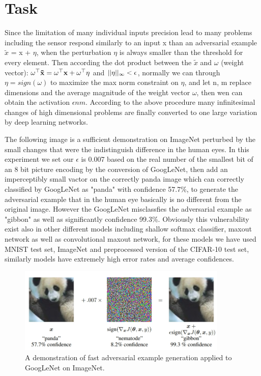 \chapter{Task}

Since the limitation of many individual inputs precision lead to many problems including the sensor respond similarly to an input x than an adversarial example $\tilde{x}$ = x + $\eta$, when the perturbation $\eta$ is always smaller than the threshold for every element. Then according the dot product between the $\tilde{x}$ and $\omega$ (weight vector): $\bf \omega ^ \top \tilde{x} = \omega ^ \top x + \omega^\top\eta$ and $\bf ||\eta||_\infty < \epsilon$, normally we can through $\eta = sign(\omega)$ to maximize the max norm constraint on $\eta$, and let n, m replace dimensions and the average magnitude of the weight vector $\omega$, then wen can obtain the activation $\epsilon nm$. According to the above procedure many infinitesimal changes of high dimensional problems are finally converted to one large variation by deep learning networks.

The following image is a sufficient demonstration on ImageNet perturbed by the small changes that were the indistinguish difference in the human eyes. In this experiment we set our $\epsilon$ is 0.007 based on the real number of the smallest bit of an 8 bit picture encoding by the conversion of GoogLeNet, then add an imperceptibly small vactor on the correctly panda image which can correctly classified by GoogLeNet as "panda" with confidence 57.7\%, to generate the adversarial example that in the human eye basically is no different from the original image. However the GoogLeNet misclassfies the adversarial example as "gibbon" as well as significantly confidence 99.3\%. Obviously this vulnerability exist also in other different models including shallow softmax classifier, maxout network as well as convolutional maxout network, for these models we have used MNIST test set, ImageNet and preprocessed version of the CIFAR-10 test set, similarly models have extremely high error rates and average confidences.

\begin{figure}
  \begin{center}
    \includegraphics[width=10cm]{image/task.jpg}
  \end{center}
  \caption{ A demonstration of fast adversarial example generation applied to GoogLeNet \cite{szegedy2013intriguing} on ImageNet.}
\end{figure}

